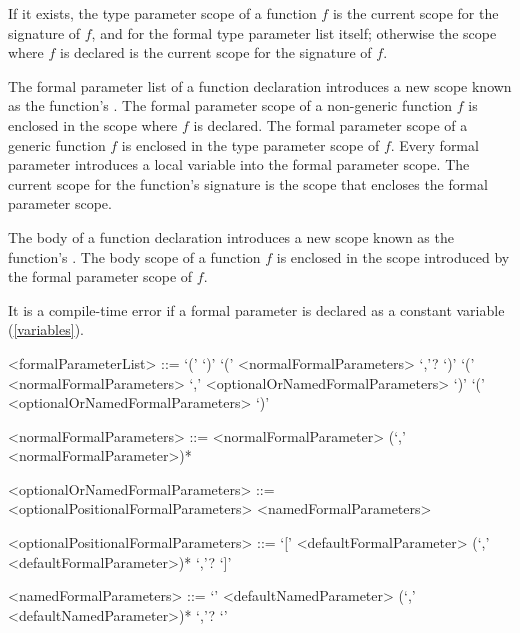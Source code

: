 \documentclass[makeidx]{article}
\begin{document}
\LMHash{}%
If it exists, the type parameter scope of a function $f$ is
the current scope for the signature of $f$,
and for the formal type parameter list itself;
otherwise the scope where $f$ is declared is
the current scope for the signature of $f$.


\LMHash{}%
The formal parameter list of a function declaration introduces
a new scope known as the function's
.
The formal parameter scope of a non-generic function $f$ is enclosed in
the scope where $f$ is declared.
The formal parameter scope of a generic function $f$ is enclosed in
the type parameter scope of $f$.
Every formal parameter introduces a local variable into
the formal parameter scope.
The current scope for the function's signature is
the scope that encloses the formal parameter scope.


\LMHash{}%
The body of a function declaration introduces
a new scope known as the function's
.
The body scope of a function $f$ is enclosed in the scope introduced by
the formal parameter scope of $f$.

\LMHash{}%
It is a compile-time error if a formal parameter
is declared as a constant variable (\ref{variables}).

\begin{grammar}
<formalParameterList> ::= `(' `)'
  \alt `(' <normalFormalParameters> `,'? `)'
  \alt `(' <normalFormalParameters> `,' <optionalOrNamedFormalParameters> `)'
  \alt `(' <optionalOrNamedFormalParameters> `)'

<normalFormalParameters> ::= \gnewline{}
  <normalFormalParameter> (`,' <normalFormalParameter>)*

<optionalOrNamedFormalParameters> ::= <optionalPositionalFormalParameters>
  \alt <namedFormalParameters>

<optionalPositionalFormalParameters> ::= \gnewline{}
  `[' <defaultFormalParameter> (`,' <defaultFormalParameter>)* `,'? `]'

<namedFormalParameters> ::= \gnewline{}
  `{' <defaultNamedParameter> (`,' <defaultNamedParameter>)* `,'? `}'
\end{grammar}
\end{document}
